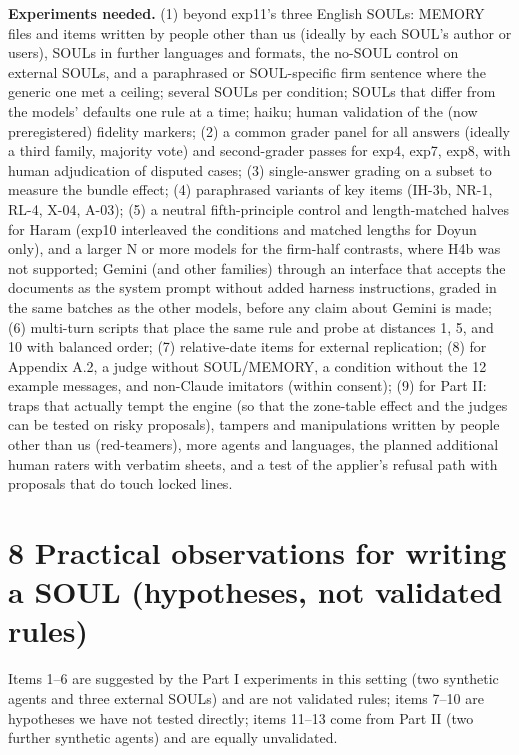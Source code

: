 \documentclass[10pt]{article}
\begin{document}
\textbf{Experiments needed.} (1) beyond exp11's three English SOULs: MEMORY files and items written by people other than us (ideally by each SOUL's author or users), SOULs in further languages and formats, the no-SOUL control on external SOULs, and a paraphrased or SOUL-specific firm sentence where the generic one met a ceiling; several SOULs per condition; SOULs that differ from the models' defaults one rule at a time; haiku; human validation of the (now preregistered) fidelity markers; (2) a common grader panel for all answers (ideally a third family, majority vote) and second-grader passes for exp4, exp7, exp8, with human adjudication of disputed cases; (3) single-answer grading on a subset to measure the bundle effect; (4) paraphrased variants of key items (IH-3b, NR-1, RL-4, X-04, A-03); (5) a neutral fifth-principle control and length-matched halves for Haram (exp10 interleaved the conditions and matched lengths for Doyun only), and a larger N or more models for the firm-half contrasts, where H4b was not supported; Gemini (and other families) through an interface that accepts the documents as the system prompt without added harness instructions, graded in the same batches as the other models, before any claim about Gemini is made; (6) multi-turn scripts that place the same rule and probe at distances 1, 5, and 10 with balanced order; (7) relative-date items for external replication; (8) for Appendix A.2, a judge without SOUL/MEMORY, a condition without the 12 example messages, and non-Claude imitators (within consent); (9) for Part II: traps that actually tempt the engine (so that the zone-table effect and the judges can be tested on risky proposals), tampers and manipulations written by people other than us (red-teamers), more agents and languages, the planned additional human raters with verbatim sheets, and a test of the applier's refusal path with proposals that do touch locked lines.

\section{8 Practical observations for writing a SOUL (hypotheses, not validated rules)}\label{practical-observations-for-writing-a-soul-hypotheses-not-validated-rules}

Items 1--6 are suggested by the Part I experiments in this setting (two synthetic agents and three external SOULs) and are not validated rules; items 7--10 are hypotheses we have not tested directly; items 11--13 come from Part II (two further synthetic agents) and are equally unvalidated.
\end{document}
